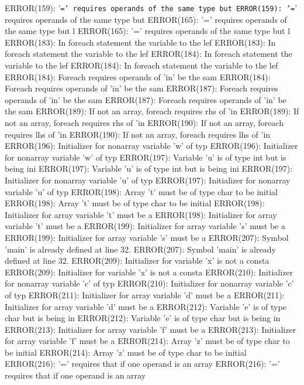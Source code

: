\documentclass[12pt]{book}
\begin{document}
ERROR(159): '\texttt{=' requires operands of the same type but 	ERROR(159): '=}' requires operands of the same type but 
ERROR(165): '=' requires operands of the same type but l        ERROR(165): '=' requires operands of the same type but l
ERROR(183): In foreach statement the variable to the lef        ERROR(183): In foreach statement the variable to the lef
ERROR(184): In foreach statement the variable to the lef        ERROR(184): In foreach statement the variable to the lef
ERROR(184): Foreach requires operands of 'in' be the sam        ERROR(184): Foreach requires operands of 'in' be the sam
ERROR(187): Foreach requires operands of 'in' be the sam        ERROR(187): Foreach requires operands of 'in' be the sam
ERROR(189): If not an array, foreach requires rhs of 'in        ERROR(189): If not an array, foreach requires rhs of 'in
ERROR(190): If not an array, foreach requires lhs of 'in        ERROR(190): If not an array, foreach requires lhs of 'in
ERROR(196): Initializer for nonarray variable 'w' of typ        ERROR(196): Initializer for nonarray variable 'w' of typ
ERROR(197): Variable 'u' is of type int but is being ini        ERROR(197): Variable 'u' is of type int but is being ini
ERROR(197): Initializer for nonarray variable 'u' of typ        ERROR(197): Initializer for nonarray variable 'u' of typ
ERROR(198): Array 't' must be of type char to be initial        ERROR(198): Array 't' must be of type char to be initial
ERROR(198): Initializer for array variable 't' must be a        ERROR(198): Initializer for array variable 't' must be a
ERROR(199): Initializer for array variable 's' must be a        ERROR(199): Initializer for array variable 's' must be a
ERROR(207): Symbol 'main' is already defined at line 32.        ERROR(207): Symbol 'main' is already defined at line 32.
ERROR(209): Initializer for variable 'x' is not a consta        ERROR(209): Initializer for variable 'x' is not a consta
ERROR(210): Initializer for nonarray variable 'c' of typ        ERROR(210): Initializer for nonarray variable 'c' of typ
ERROR(211): Initializer for array variable 'd' must be a        ERROR(211): Initializer for array variable 'd' must be a
ERROR(212): Variable 'e' is of type char but is being in        ERROR(212): Variable 'e' is of type char but is being in
ERROR(213): Initializer for array variable 'f' must be a        ERROR(213): Initializer for array variable 'f' must be a
ERROR(214): Array 'z' must be of type char to be initial        ERROR(214): Array 'z' must be of type char to be initial
ERROR(216): '=' requires that if one operand is an array        ERROR(216): '=' requires that if one operand is an array
\end{document}
